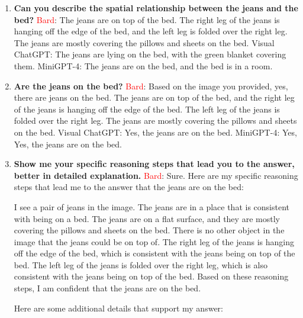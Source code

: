 \begin{enumerate}
    \item \textbf{Can you describe the spatial relationship between the jeans and the bed?}
    \subitem \textcolor{Red}{Bard}: 
    The jeans are on top of the bed. The right leg of the jeans is hanging off the edge of the bed, and the left leg is folded over the right leg. The jeans are mostly covering the pillows and sheets on the bed.
    \subitem Visual ChatGPT: The jeans are lying on the bed, with the green blanket covering them.
    \subitem MiniGPT-4: The jeans are on the bed, and the bed is in a room.
    \item \textbf{Are the jeans on the bed?}
    \subitem \textcolor{Red}{Bard}: 
    Based on the image you provided, yes, there are jeans on the bed. The jeans are on top of the bed, and the right leg of the jeans is hanging off the edge of the bed. The left leg of the jeans is folded over the right leg. The jeans are mostly covering the pillows and sheets on the bed.
    \subitem Visual ChatGPT: Yes, the jeans are on the bed.
    \subitem MiniGPT-4: Yes, Yes, the jeans are on the bed.
    \item \textbf{Show me your specific reasoning steps that lead you to the answer, better in detailed explanation.}
    \subitem \textcolor{Red}{Bard}: 
    Sure. Here are my specific reasoning steps that lead me to the answer that the jeans are on the bed:
    
    I see a pair of jeans in the image.
    The jeans are in a place that is consistent with being on a bed. The jeans are on a flat surface, and they are mostly covering the pillows and sheets on the bed.
    There is no other object in the image that the jeans could be on top of.
    The right leg of the jeans is hanging off the edge of the bed, which is consistent with the jeans being on top of the bed.
    The left leg of the jeans is folded over the right leg, which is also consistent with the jeans being on top of the bed.
    Based on these reasoning steps, I am confident that the jeans are on the bed.
    
    Here are some additional details that support my answer:
    

\end{enumerate}

